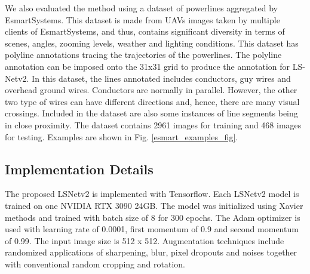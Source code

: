 \documentclass[journal]{IEEEtran}
\begin{document}
We also evaluated the method using a dataset of powerlines aggregated by EsmartSystems. This dataset is made from UAVs images taken by multiple clients of EsmartSystems, and thus, contains significant diversity in terms of scenes, angles, zooming levels, weather and lighting conditions. This dataset has polyline annotations tracing the trajectories of the powerlines. The polyline annotation can be imposed onto the 31x31 grid to produce the annotation for LS-Netv2.
In this dataset, the lines annotated includes conductors, guy wires and overhead ground wires. Conductors are normally in parallel. However, the other two type of wires can have different directions and, hence, there are many visual crossings. Included in the dataset are also some instances of line segments being in close proximity. The dataset contains 2961 images for training and 468 images for testing. Examples are shown in Fig. \ref{esmart_examples_fig}.

\subsection{Implementation Details}

The proposed LSNetv2 is implemented with Tensorflow. Each LSNetv2 model is trained on one NVIDIA RTX 3090 24GB. The model was initialized using Xavier methods and trained with batch size of 8 for 300 epochs. The Adam optimizer is used with learning rate of 0.0001, first momentum of 0.9 and second momentum of 0.99. The input image size is 512 x 512. Augmentation techniques include randomized applications of sharpening, blur, pixel dropouts and noises together with conventional random cropping and rotation. 

\end{document}
